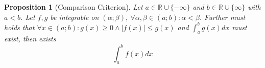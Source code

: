 \documentclass[english,titlepage]{uzhpub}
\theoremstyle{definition}
\theoremstyle{plain}
\newtheorem{proposition}[definition]{Proposition}
\theoremstyle{remark}
\theoremstyle{example}
\begin{document}
   \begin{proposition}[Comparison Criterion]
      Let \(a \in \mathbb{R} \cup \{-\infty\}\) and \(b \in \mathbb{R} \cup \{\infty\}\) with \(a < b\).
      Let \(f, g\) be integrable on \((\alpha; \beta),~\forall \alpha, \beta \in (a; b): \alpha < \beta\).
      Further must holds that \(\forall x \in (a;b): g(x) \geq 0 \land |f(x)| \leq g(x)\) and \(\int_a^b g(x) dx\) must exist, then exists
      \[\int_a^b f(x) dx\]
   \end{proposition}

   \newpage
   \printglossaries
\end{document}
